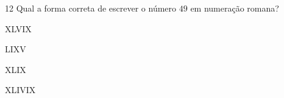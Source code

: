 
\num{12} Qual a forma correta de escrever o número $49$ em numeração romana?

\begin{escolha}
\item XLVIX
\item LIXV
\item XLIX
\item XLIVIX
\end{escolha}



